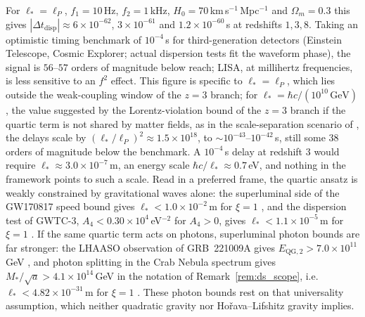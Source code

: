 \documentclass[11pt,a4paper,reqno]{amsart}
\theoremstyle{definition}
\numberwithin{equation}{section}
\begin{document}
\begin{enumerate}[label=(\roman*),leftmargin=1.8em]
    For $\ell_\ast = \ell_P$, $f_1 = 10$\,Hz, $f_2 = 1$\,kHz, $H_0 = 70$\,km\,s$^{-1}$\,Mpc$^{-1}$ and $\Omega_m = 0.3$ this gives $|\Delta t_{\mathrm{disp}}| \approx 6 \times 10^{-62}$, $3 \times 10^{-61}$ and $1.2 \times 10^{-60}$\,s at redshifts $1, 3, 8$. Taking an optimistic timing benchmark of $10^{-4}$\,s for third-generation detectors (Einstein Telescope, Cosmic Explorer; actual dispersion tests fit the waveform phase), the signal is $56$--$57$ orders of magnitude below reach; LISA, at millihertz frequencies, is less sensitive to an $f^2$ effect. This figure is specific to $\ell_\ast = \ell_P$, which lies outside the weak-coupling window of the $z = 3$ branch; for $\ell_\ast = \hbar c/(10^{10}\,\mathrm{GeV})$, the value suggested by the Lorentz-violation bound of the $z = 3$ branch if the quartic term is not shared by matter fields, as in the scale-separation scenario of \cite{pospelov2012lorentz}, the delays scale by $(\ell_\ast/\ell_P)^2 \approx 1.5 \times 10^{18}$, to $\sim 10^{-43}$--$10^{-42}$\,s, still some $38$ orders of magnitude below the benchmark. A $10^{-4}$\,s delay at redshift $3$ would require $\ell_\ast \approx 3.0 \times 10^{-7}$\,m, an energy scale $\hbar c/\ell_\ast \approx 0.7$\,eV, and nothing in the framework points to such a scale. Read in a preferred frame, the quartic ansatz is weakly constrained by gravitational waves alone: the superluminal side of the GW170817 speed bound gives $\ell_\ast < 1.0 \times 10^{-2}$\,m for $\xi = 1$ \cite{abbott2017gravitational}, and the dispersion test of GWTC-3, $A_4 < 0.30 \times 10^4$\,eV$^{-2}$ for $A_4 > 0$, gives $\ell_\ast < 1.1 \times 10^{-5}$\,m for $\xi = 1$ \cite{gwtc3tgr}. If the same quartic term acts on photons, superluminal photon bounds are far stronger: the LHAASO observation of GRB~221009A gives $E_{\mathrm{QG},2} > 7.0 \times 10^{11}$\,GeV \cite{lhaaso2024}, and photon splitting in the Crab Nebula spectrum gives $M_\ast/\sqrt{a} > 4.1 \times 10^{14}$\,GeV in the notation of Remark~\ref{rem:ds_scope}, i.e.\ $\ell_\ast < 4.82 \times 10^{-31}$\,m for $\xi = 1$ \cite{satunin2019}. These photon bounds rest on that universality assumption, which neither quadratic gravity nor Ho\v{r}ava--Lifshitz gravity implies.


\end{enumerate}
\end{document}
